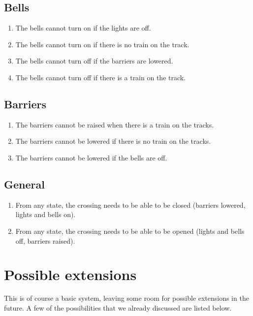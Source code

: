 \documentclass[final]{report}
\begin{document}
\subsection{Bells}
	\begin{enumerate}
		\item The bells cannot turn on if the lights are off.
		\item The bells cannot turn on if there is no train on the track.
		\item The bells cannot turn off if the barriers are lowered.
		\item The bells cannot turn off if there is a train on the track.
	\end{enumerate}

\subsection{Barriers}
	\begin{enumerate}
		\item The barriers cannot be raised when there is a train on the tracks.
		\item The barriers cannot be lowered if there is no train on the tracks.
		\item The barriers cannot be lowered if the bells are off.
	\end{enumerate}
	
\subsection{General}
	\begin{enumerate}
	\item From any state, the crossing needs to be able to be closed (barriers lowered, lights and bells on).
	\item From any state, the crossing needs to be able to be opened (lights and bells off, barriers raised).
	\end{enumerate}


\section{Possible extensions}
This is of course a basic system, leaving some room for possible extensions in the future.
A few of the possibilities that we already discussed are listed below.
\end{document}
